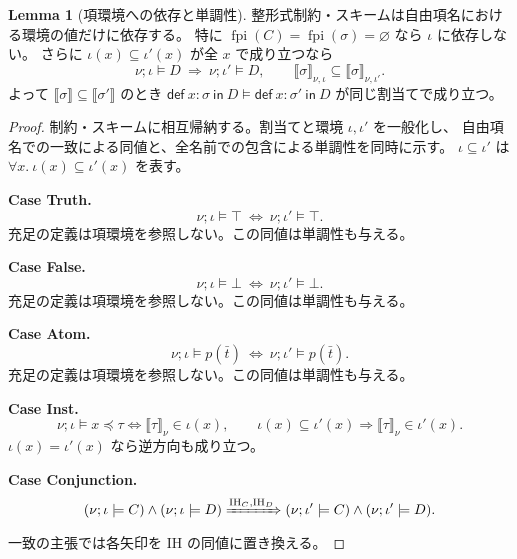 \documentclass[a4paper,11pt]{article}
\theoremstyle{definition}
\newtheorem{lemma}[definition]{Lemma}
\newenvironment{Case}[1]{\par\smallskip\noindent\textbf{Case #1.}\enspace\ignorespaces}{\par}
\newcommand{\FPI}{\operatorname{fpi}}
\newcommand{\emp}{\varnothing}
\newcommand{\den}[1]{\llbracket #1\rrbracket}
\newcommand{\inst}[2]{#1\preccurlyeq #2}
\newcommand{\Def}[3]{\mathsf{def}\ #1:#2\ \mathsf{in}\ #3}
\newcommand{\proofspace}{\Needspace{16\baselineskip}}
\begin{document}
\proofspace
\begin{samepage}
\begin{lemma}[項環境への依存と単調性]\label{lem:ground}
整形式制約・スキームは自由項名における環境の値だけに依存する。
特に $\FPI(C)=\FPI(\sigma)=\emp$ なら $\iota$ に依存しない。
さらに $\iota(x)\subseteq\iota'(x)$ が全 $x$ で成り立つなら
\[
 \nu;\iota\models D\ \Longrightarrow\ \nu;\iota'\models D,
 \qquad \den\sigma_{\nu,\iota}\subseteq\den\sigma_{\nu,\iota'}.
\]
よって $\den\sigma\subseteq\den{\sigma'}$ のとき
$\Def x\sigma D\models\Def x{\sigma'}D$ が同じ割当てで成り立つ。
\end{lemma}
\end{samepage}
\nopagebreak[4]
\begin{proof}\leavevmode\label{proof:lem:ground}
制約・スキームに相互帰納する。割当てと環境 $\iota,\iota'$ を一般化し、
自由項名での一致による同値と、全名前での包含による単調性を同時に示す。
$\iota\subseteq\iota'$ は $\forall x.\ \iota(x)\subseteq\iota'(x)$ を表す。

\begin{Case}{Truth}
\[\nu;\iota\models \top\ \Longleftrightarrow\ \nu;\iota'\models \top.\]
充足の定義は項環境を参照しない。この同値は単調性も与える。
\end{Case}

\begin{Case}{False}
\[\nu;\iota\models \bot\ \Longleftrightarrow\ \nu;\iota'\models \bot.\]
充足の定義は項環境を参照しない。この同値は単調性も与える。
\end{Case}

\begin{Case}{Atom}
\[\nu;\iota\models p(\bar t)\ \Longleftrightarrow\ \nu;\iota'\models p(\bar t).\]
充足の定義は項環境を参照しない。この同値は単調性も与える。
\end{Case}

\begin{Case}{Inst}
\[
 \nu;\iota\models\inst x\tau\Longleftrightarrow\den\tau_\nu\in\iota(x),\qquad
 \iota(x)\subseteq\iota'(x)\Longrightarrow\den\tau_\nu\in\iota'(x).
\]
$\iota(x)=\iota'(x)$ なら逆方向も成り立つ。
\end{Case}

\begin{Case}{Conjunction}
\[
 (\nu;\iota\models C)\land(\nu;\iota\models D)
 \xRightarrow{\mathrm{IH}_C,\mathrm{IH}_D}
 (\nu;\iota'\models C)\land(\nu;\iota'\models D).
\]
一致の主張では各矢印を IH の同値に置き換える。
\end{Case}


\end{proof}
\end{document}
